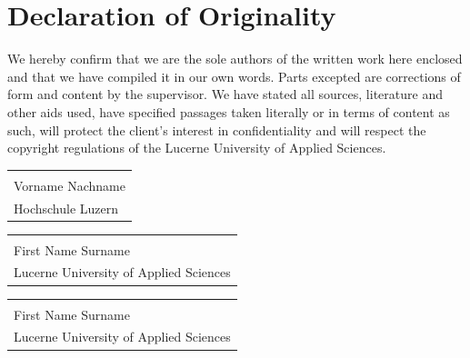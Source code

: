 \chapter*{Declaration of Originality}
We hereby confirm that we are the sole authors of the written work here enclosed and that we have compiled it in our own words. Parts excepted are corrections of form and content by the supervisor. We have stated all sources, literature and other aids used, have specified passages taken literally or in terms of content as such, will protect the client's interest in confidentiality and will respect the copyright regulations of the Lucerne University of Applied Sciences.



\vspace{50mm}
\begin{tabular}{@{}p{2.5in}@{}}
\hrulefill \\
Vorname Nachname \\
Hochschule Luzern
\end{tabular}

\vspace{25mm}
\begin{tabular}{@{}p{2.5in}@{}}
\hrulefill \\
First Name Surname\\
Lucerne University of Applied Sciences
\end{tabular}

\vspace{25mm}
\begin{tabular}{@{}p{2.5in}@{}}
\hrulefill \\
First Name Surname\\
Lucerne University of Applied Sciences
\end{tabular}
